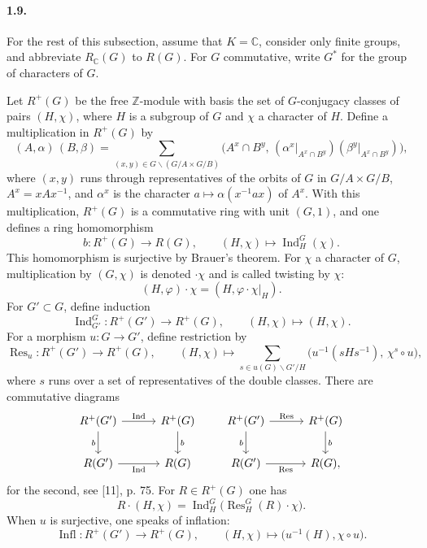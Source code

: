 \documentclass[10pt,letterpaper]{article}
\newcommand{\C}{\mathbb C}
\newcommand{\Z}{\mathbb Z}
\newcommand{\Ind}{\operatorname{Ind}}
\newcommand{\Res}{\operatorname{Res}}
\providecommand{\Ind}{\operatorname{Ind}}
\begin{document}
\paragraph{1.9.} For the rest of this subsection, assume that \(K=\C\), consider only finite groups, and abbreviate \(R_\C(G)\) to \(R(G)\). For \(G\) commutative, write \(G^*\) for the group of characters of \(G\).

Let \(R^+(G)\) be the free \(\Z\)-module with basis the set of \(G\)-conjugacy classes of pairs \((H,\chi)\), where \(H\) is a subgroup of \(G\) and \(\chi\) a character of \(H\). Define a multiplication in \(R^+(G)\) by
\[
\tag{1.9.1}
(A,\alpha)\,(B,\beta)=
\sum_{(x,y)\in G\backslash(G/A\times G/B)}
\bigl(A^x\cap B^y,\,
(\alpha^x|_{A^x\cap B^y})(\beta^y|_{A^x\cap B^y})\bigr),
\]
where \((x,y)\) runs through representatives of the orbits of \(G\) in \(G/A\times G/B\), \(A^x=xAx^{-1}\), and \(\alpha^x\) is the character \(a\mapsto \alpha(x^{-1}ax)\) of \(A^x\). With this multiplication, \(R^+(G)\) is a commutative ring with unit \((G,1)\), and one defines a ring homomorphism
\[
\tag{1.9.2}
b:R^+(G)\longrightarrow R(G),\qquad (H,\chi)\longmapsto \Ind_H^G(\chi).
\]
This homomorphism is surjective by Brauer's theorem. For \(\chi\) a character of \(G\), multiplication by \((G,\chi)\) is denoted \(\cdot\chi\) and is called twisting by \(\chi\):
\[
\tag{1.9.3}
(H,\varphi)\cdot\chi=(H,\varphi\cdot\chi|_H).
\]
For \(G'\subset G\), define induction
\[
\tag{1.9.4}
\Ind_{G'}^G:R^+(G')\longrightarrow R^+(G),\qquad (H,\chi)\longmapsto(H,\chi).
\]
For a morphism \(u:G\to G'\), define restriction by
\[
\tag{1.9.5}
\Res_u:R^+(G')\longrightarrow R^+(G),\qquad (H,\chi)\longmapsto
\sum_{s\in u(G)\backslash G'/H}
\bigl(u^{-1}(sHs^{-1}),\,\chi^s\circ u\bigr),
\]
where \(s\) runs over a set of representatives of the double classes. There are commutative diagrams
\[
\begin{tikzcd}[column sep=3.0em,row sep=2.0em]
R^+(G') \arrow[r,"\Ind"] \arrow[d,"b"'] & R^+(G) \arrow[d,"b"]\\
R(G') \arrow[r,"\Ind"'] & R(G)
\end{tikzcd}
\qquad
\begin{tikzcd}[column sep=3.0em,row sep=2.0em]
R^+(G') \arrow[r,"\Res"] \arrow[d,"b"'] & R^+(G) \arrow[d,"b"]\\
R(G') \arrow[r,"\Res"'] & R(G),
\end{tikzcd}
\]
for the second, see [11], p. 75. For \(R\in R^+(G)\) one has
\[
\tag{1.9.6}
R\cdot(H,\chi)=\Ind_H^G\bigl(\Res_H^G(R)\cdot\chi\bigr).
\]
When \(u\) is surjective, one speaks of inflation:
\[
\tag{1.9.7}
\operatorname{Infl}:R^+(G')\longrightarrow R^+(G),\qquad
(H,\chi)\longmapsto\bigl(u^{-1}(H),\chi\circ u\bigr).
\]
\end{document}
